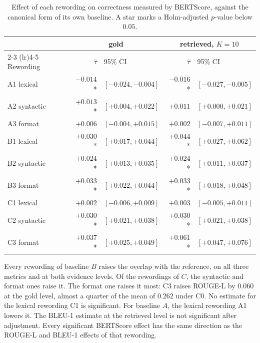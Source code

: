 \documentclass[12pt,a4paper,oneside]{scrreprt}
\begin{document}
\begin{table}[htbp]
\centering
\caption{Effect of each rewording on correctness measured by BERTScore, against the canonical form of its own baseline. A star marks a Holm-adjusted $p$-value below $0.05$.}
\label{tab:bertscore}
\begin{tabular}{lrlrl}
\toprule
 & \multicolumn{2}{c}{gold} & \multicolumn{2}{c}{retrieved, $K = 10$} \\
\cmidrule(lr){2-3} \cmidrule(lr){4-5}
Rewording & $\hat{\tau}$ & 95\% CI & $\hat{\tau}$ & 95\% CI \\
\midrule
A1 lexical   & $-0.014$* & $[-0.024, -0.004]$ & $-0.016$* & $[-0.027, -0.005]$ \\
A2 syntactic & $+0.013$* & $[+0.004, +0.022]$ & $+0.011$\phantom{*} & $[+0.000, +0.021]$ \\
A3 format    & $+0.006$\phantom{*} & $[-0.004, +0.015]$ & $+0.002$\phantom{*} & $[-0.007, +0.011]$ \\
B1 lexical   & $+0.030$* & $[+0.017, +0.044]$ & $+0.044$* & $[+0.027, +0.062]$ \\
B2 syntactic & $+0.024$* & $[+0.013, +0.035]$ & $+0.024$* & $[+0.011, +0.037]$ \\
B3 format    & $+0.033$* & $[+0.022, +0.044]$ & $+0.033$* & $[+0.018, +0.048]$ \\
C1 lexical   & $+0.002$\phantom{*} & $[-0.006, +0.009]$ & $+0.003$\phantom{*} & $[-0.005, +0.011]$ \\
C2 syntactic & $+0.030$* & $[+0.021, +0.038]$ & $+0.030$* & $[+0.021, +0.038]$ \\
C3 format    & $+0.037$* & $[+0.025, +0.049]$ & $+0.061$* & $[+0.047, +0.076]$ \\
\bottomrule
\end{tabular}
\end{table}

Every rewording of baseline $B$ raises the overlap with the reference, on all three metrics and at both evidence levels. Of the rewordings of $C$, the syntactic and format ones raise it. The format one raises it most: C3 raises ROUGE-L by $0.060$ at the gold level, almost a quarter of the mean of $0.262$ under C0. No estimate for the lexical rewording C1 is significant. For baseline $A$, the lexical rewording A1 lowers it. The BLEU-1 estimate at the retrieved level is not significant after adjustment. Every significant BERTScore effect has the same direction as the ROUGE-L and BLEU-1 effects of that rewording. 
\end{document}
